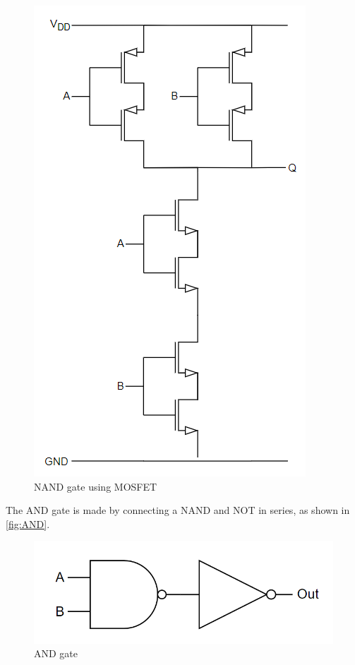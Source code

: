 \begin{figure}[H]
\begin{minipage}{0.5\textwidth}
    \includegraphics[width=\linewidth]{Figures/Nand Gate.png}
    \caption{NAND gate using MOSFET}
    \label{fig:NAND}
\end{minipage}
\end{figure}

The AND gate is made by connecting a NAND and NOT in series, as shown in \autoref{fig:AND}.
\begin{figure}[H]
    \centering
    \includegraphics[width=0.4\linewidth]{Figures/And gate.png}
    \caption{AND gate}
    \label{fig:AND}
\end{figure}

